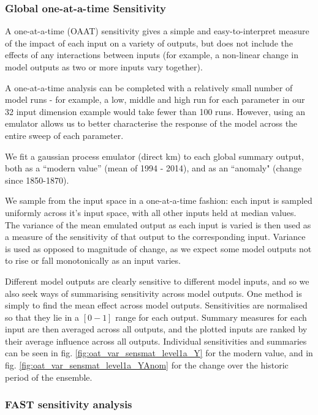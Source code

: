 \documentclass[gmd, manuscript]{copernicus}
\begin{document}
\subsubsection{Global one-at-a-time Sensitivity}

A one-at-a-time (OAAT) sensitivity gives a simple and easy-to-interpret measure of the impact of each input on a variety of outputs, but does not include the effects of any interactions between inputs (for example, a non-linear change in model outputs as two or more inputs vary together).  

A one-at-a-time analysis can be completed with a relatively small number of model runs - for example, a low, middle and high run for each parameter in our 32 input dimension example would take fewer than 100 runs. However, using an emulator allows us to better characterise the response of the model across the entire sweep of each parameter.

We fit a gaussian process emulator (direct km) to each global summary output, both as a ``modern value'' (mean of 1994 - 2014), and as an ``anomaly" (change since 1850-1870).

We sample from the input space in a one-at-a-time fashion: each input is sampled uniformly across it's input space, with all other inputs held at median values. The variance of the mean emulated output as each input is varied is then used as a measure of the sensitivity of that output to the corresponding input. Variance is used as opposed to magnitude of change, as we expect some model outputs not to rise or fall monotonically as an input varies.

Different model outputs are clearly sensitive to different model inputs, and so we also seek ways of summarising sensitivity across model outputs. One method is simply to find the mean effect across model outputs. Sensitivities are normalised so that they lie in a $[0 -1]$ range for each output. Summary measures for each input are then averaged across all outputs, and the plotted inputs are ranked by their average influence across all outputs. Individual sensitivities and summaries can be seen in fig. \ref{fig:oat_var_sensmat_level1a_Y} for the modern value, and in fig. \ref{fig:oat_var_sensmat_level1a_YAnom} for the change over the historic period of the ensemble. 

\subsubsection{FAST sensitivity analysis}
\end{document}
